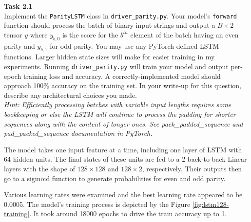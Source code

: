 \documentclass[12pt,article]{article}
\newenvironment{task}[2][Task]
    { \begin{mdframed}[backgroundcolor=gray!20] \textbf{#1 #2} \\}
    {  \end{mdframed}}
\begin{document}
\newpage
\begin{task}{2.1} 
Implement the \texttt{ParityLSTM} class in \texttt{driver\_parity.py}. Your model's \texttt{forward} function should process the batch of binary input strings and output a $B \times 2$ tensor $y$ where $y_{b,0}$ is the score for the $b^{th}$ element of the batch having an even parity and $y_{b,1}$ for odd parity. You may use any PyTorch-defined LSTM functions. Larger hidden state sizes will make for easier training in my experiments. Running \texttt{driver\_parity.py} will train your model and output per-epoch training loss and accuracy. A correctly-implemented model should approach 100\% accuracy on the training set. In your write-up for this question, describe any architectural choices you made.\\[5pt]

\emph{Hint: Efficiently processing batches with variable input lengths requires some bookkeeping or else the LSTM will continue to process the padding for shorter sequences along with the content of longer ones. See pack\_padded\_sequence and pad\_packed\_sequence documentation in PyTorch.}
\end{task}

The model takes one input feature at a time, including one layer of LSTM with 64 hidden units. The final states of these units are fed to a 2 back-to-back Linear layers with the shape of $128 \times 128$ and $128 \times 2$, respectively. Their outputs then go to a sigmoid function to generate probabilities for even and odd parity.

Various learning rates were examined and the best learning rate appeared to be 0.0005. The model's training process is depicted by the Figure \ref{fig:lstm128-training}. It took around 18000 epochs to drive the train accuracy up to 1.
\end{document}

